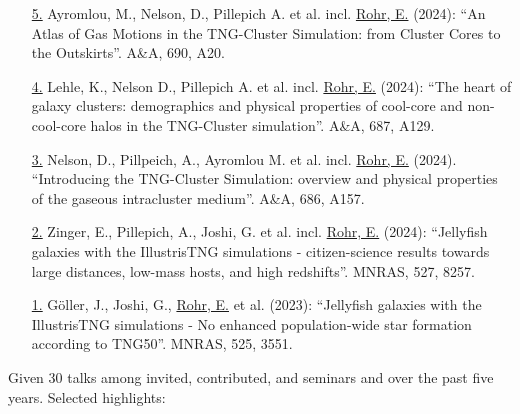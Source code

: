 \documentclass[a4paper,10pt,oneside]{article}
\begin{document}
\begin{enumerate}[wide, labelwidth=!, labelindent=-11pt, parsep=0pt]
    \item[\href{https://www.aanda.org/articles/aa/abs/2024/10/aa48612-23/aa48612-23.html}{5.}] Ayromlou, M., Nelson, D., Pillepich A. et al. incl. \underline{Rohr, E.} (2024): ``An Atlas of Gas Motions in the TNG-Cluster Simulation: from Cluster Cores to the Outskirts''. A\&A, 690, A20.
    \item[\href{https://ui.adsabs.harvard.edu/abs/2024A\%26A...687A.129L/abstract}{4.}] Lehle, K., Nelson D., Pillepich A. et al. incl. \underline{Rohr, E.} (2024): ``The heart of galaxy clusters: demographics and physical properties of cool-core and non-cool-core halos in the TNG-Cluster simulation''. A\&A, 687, A129.
    \item[\href{https://ui.adsabs.harvard.edu/abs/2024A&A...686A.157N/abstract}{3.}] Nelson, D., Pillpeich, A., Ayromlou M. et al. incl. \underline{Rohr, E.} (2024). ``Introducing the TNG-Cluster Simulation: overview and physical properties of the gaseous intracluster medium''. A\&A, 686, A157.
    \item[\href{https://ui.adsabs.harvard.edu/abs/2024MNRAS.527.8257Z/abstract}{2.}] Zinger, E., Pillepich, A., Joshi, G. et al. incl. \underline{Rohr, E.} (2024): ``Jellyfish galaxies with the IllustrisTNG simulations - citizen-science results towards large distances, low-mass hosts, and high redshifts''. MNRAS, 527, 8257.
    \item[\href{https://ui.adsabs.harvard.edu/abs/2023MNRAS.525.3551G/abstract}{1.}] G{\"o}ller, J., Joshi, G., \underline{Rohr, E.} et al. (2023): ``Jellyfish galaxies with the IllustrisTNG simulations - No enhanced population-wide star formation according to TNG50''. MNRAS, 525, 3551.
\end{enumerate}

\noindent{}

\vspace{5.5pt}

\noindent Given 30 talks among invited, contributed, and seminars and over the past five years. Selected highlights:
\end{document}
